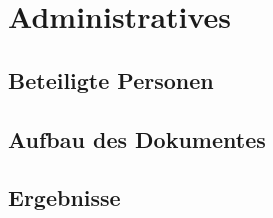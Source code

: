 
\chapter{Administratives}
\label{chap:20_administrative}

\section{Beteiligte Personen}
\label{sec:involved_persons}

\section{Aufbau des Dokumentes}
\label{sec:document_structure}

\section{Ergebnisse}
\label{sec:deliverables}
